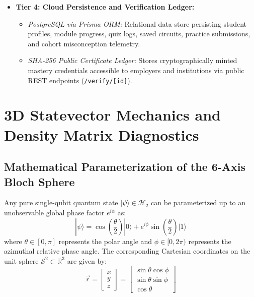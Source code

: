 \documentclass[11pt, a4paper]{article}
\begin{document}
\begin{itemize}
	\item \textbf{Tier 4: Cloud Persistence and Verification Ledger:}
	\begin{itemize}
		\item \textit{PostgreSQL via Prisma ORM:} Relational data store persisting student profiles, module progress, quiz logs, saved circuits, practice submissions, and cohort misconception telemetry.
		\item \textit{SHA-256 Public Certificate Ledger:} Stores cryptographically minted mastery credentials accessible to employers and institutions via public REST endpoints (\texttt{/verify/[id]}).
	\end{itemize}
\end{itemize}

\newpage

\section{3D Statevector Mechanics and Density Matrix Diagnostics}

\subsection{Mathematical Parameterization of the 6-Axis Bloch Sphere}
Any pure single-qubit quantum state $|\psi\rangle \in \mathcal{H}_2$ can be parameterized up to an unobservable global phase factor $e^{i\alpha}$ as:
\begin{equation}
|\psi\rangle = \cos\left(\frac{\theta}{2}\right)|0\rangle + e^{i\phi}\sin\left(\frac{\theta}{2}\right)|1\rangle
\end{equation}
where $\theta \in [0, \pi]$ represents the polar angle and $\phi \in [0, 2\pi)$ represents the azimuthal relative phase angle. The corresponding Cartesian coordinates on the unit sphere $\mathcal{S}^2 \subset \mathbb{R}^3$ are given by:
\begin{equation}
\vec{r} = \begin{bmatrix} x \\ y \\ z \end{bmatrix} = \begin{bmatrix} \sin\theta\cos\phi \\ \sin\theta\sin\phi \\ \cos\theta \end{bmatrix}
\end{equation}
\end{document}
